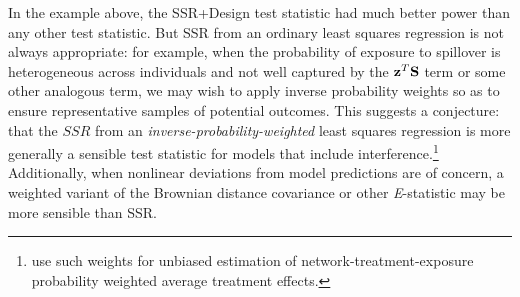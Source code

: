 In the example above, the SSR+Design test statistic had much better power than
any other test statistic. But SSR from an ordinary least squares regression is
not always appropriate: for example, when the probability of exposure to
spillover is heterogeneous across individuals and not well captured by the
$\mathbf{z}^T \mathbf{S}$ term or some other analogous term, we may wish to apply inverse
probability weights so as to ensure representative samples of potential
outcomes. This suggests a conjecture: that the $SSR$ from an {\it
  inverse-probability-weighted} least squares regression is more generally a
sensible test statistic for models that include
interference.\footnote{\citet{aronowsamii2012interfere} use such weights for
  unbiased estimation of network-treatment-exposure probability weighted
  average treatment effects.}  Additionally, when nonlinear deviations from
model predictions are of concern, a weighted variant of the Brownian distance
covariance \cite{szekely2009brownian} or other {\it E}-statistic may be more
sensible than SSR.


